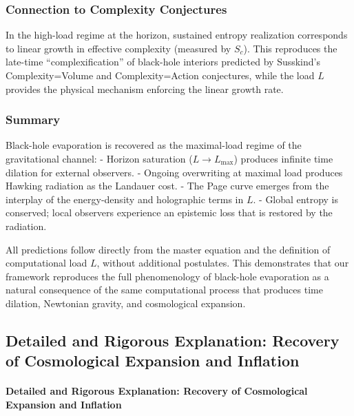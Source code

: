 \documentclass[reprint,amsmath,amssymb,aps,prd,preprintnumbers,superscriptaddress,longbibliography,10pt]{revtex4-2}
\begin{document}
\subsubsection{Connection to Complexity Conjectures}

In the high-load regime at the horizon, sustained entropy realization corresponds to linear growth in effective complexity (measured by \(S_c\)). This reproduces the late-time “complexification” of black-hole interiors predicted by Susskind’s Complexity=Volume and Complexity=Action conjectures, while the load \(L\) provides the physical mechanism enforcing the linear growth rate.

\subsubsection{Summary}

Black-hole evaporation is recovered as the maximal-load regime of the gravitational channel:
- Horizon saturation (\(L \to L_{\max}\)) produces infinite time dilation for external observers.
- Ongoing overwriting at maximal load produces Hawking radiation as the Landauer cost.
- The Page curve emerges from the interplay of the energy-density and holographic terms in \(L\).
- Global entropy is conserved; local observers experience an epistemic loss that is restored by the radiation.

All predictions follow directly from the master equation and the definition of computational load \(L\), without additional postulates. This demonstrates that our framework reproduces the full phenomenology of black-hole evaporation as a natural consequence of the same computational process that produces time dilation, Newtonian gravity, and cosmological expansion.

\subsection{Detailed and Rigorous Explanation: Recovery of Cosmological Expansion and Inflation}

\paragraph{Detailed and Rigorous Explanation: Recovery of Cosmological Expansion and Inflation}
\end{document}
